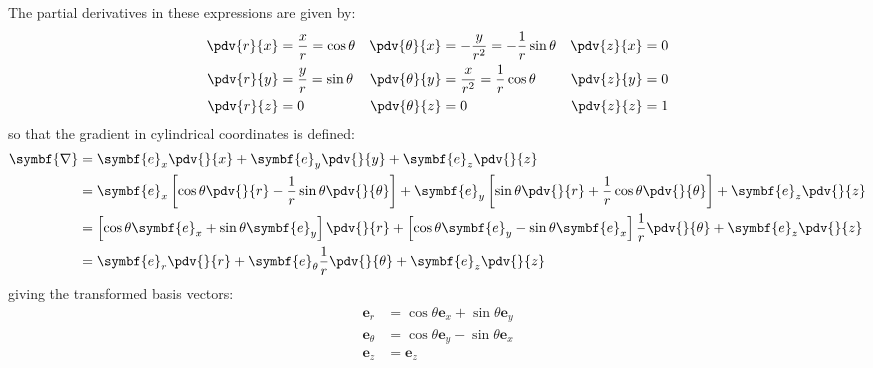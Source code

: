 \documentclass{article}
\begin{document}
The partial derivatives in these expressions are given by:
\begin{align*}
    \pdv{r}{x} & = \frac{x}{r} = \cos{\theta} & \pdv{\theta}{x} & = -\frac{y}{r^2} = -\frac{1}{r}\sin{\theta} & \pdv{z}{x} & = 0 \\
    \pdv{r}{y} & = \frac{y}{r} = \sin{\theta} & \pdv{\theta}{y} & = \frac{x}{r^2} = \frac{1}{r}\cos{\theta}   & \pdv{z}{y} & = 0 \\
    \pdv{r}{z} & = 0                          & \pdv{\theta}{z} & = 0                                         & \pdv{z}{z} & = 1
\end{align*}
so that the gradient in cylindrical coordinates is defined:
\begin{align*}
    \symbf{\nabla} & = \symbf{e}_x \pdv{}{x} + \symbf{e}_y \pdv{}{y} + \symbf{e}_z \pdv{}{z}                                                                                                                                             \\
                   & = \symbf{e}_x \left[ \cos{\theta} \pdv{}{r} - \frac{1}{r} \sin{\theta} \pdv{}{\theta} \right] + \symbf{e}_y \left[ \sin{\theta} \pdv{}{r} + \frac{1}{r} \cos{\theta} \pdv{}{\theta} \right] + \symbf{e}_z \pdv{}{z} \\
                   & = \left[ \cos{\theta} \symbf{e}_x + \sin{\theta} \symbf{e}_y \right] \pdv{}{r} + \left[ \cos{\theta} \symbf{e}_y - \sin{\theta} \symbf{e}_x \right] \frac{1}{r} \pdv{}{\theta} + \symbf{e}_z \pdv{}{z}              \\
                   & = \symbf{e}_r \pdv{}{r} + \symbf{e}_\theta \frac{1}{r} \pdv{}{\theta} + \symbf{e}_z \pdv{}{z}
\end{align*}
giving the transformed basis vectors:
\begin{align*}
    \symbf{e}_r      & = \cos{\theta} \symbf{e}_x + \sin{\theta} \symbf{e}_y \\
    \symbf{e}_\theta & = \cos{\theta} \symbf{e}_y - \sin{\theta} \symbf{e}_x \\
    \symbf{e}_z      & = \symbf{e}_z
\end{align*}
\end{document}
